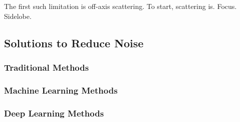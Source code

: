 The first such limitation is off-axis scattering. To start, scattering is. Focus. Sidelobe.

%
%





%





\subsection{Solutions to Reduce Noise}
\subsubsection{Traditional Methods}
\subsubsection{Machine Learning Methods}
\subsubsection{Deep Learning Methods}
